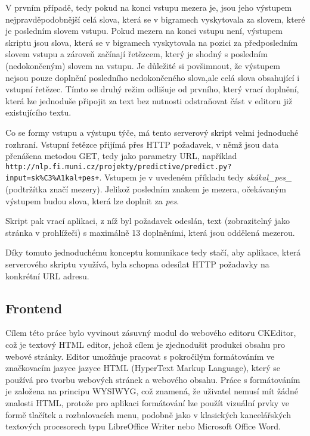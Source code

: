 \documentclass[a4paper,11pt]{article}
\begin{document}
V prvním případě, tedy pokud na konci vstupu mezera je, jsou jeho výstupem nejpravděpodobnější celá slova, která se v bigramech vyskytovala za slovem, které je posledním slovem vstupu. Pokud mezera na konci vstupu není, výstupem skriptu jsou slova, která se v bigramech vyskytovala na pozici za předposledním slovem vstupu a zároveň začínají řetězcem, který je shodný s posledním (nedokončeným) slovem na vstupu. Je důležité si povšimnout, že výstupem nejsou pouze doplnění posledního nedokončeného slova,ale celá slova obsahující i vstupní řetězec. Tímto se druhý režim odlišuje od prvního, který vrací doplnění, která lze jednoduše připojit za text bez nutnosti odstraňovat část v editoru již existujícího textu.

Co se formy vstupu a výstupu týče, má tento serverový skript velmi jednoduché rozhraní. Vstupní řetězce přijímá přes HTTP požadavek, v němž jsou data přenášena metodou GET, tedy jako parametry URL, například {\tt http://nlp.fi.muni.cz/projekty/predictive/predict.py?input=sk\%C3\%A1kal+pes+}. Vstupem je v uvedeném příkladu tedy {\it skákal\_pes\_} (podtržítka značí mezery). Jelikož posledním znakem je mezera, očekávaným výstupem budou slova, která lze doplnit za {\it pes}. 

Skript pak vrací aplikaci, z níž byl požadavek odeslán, text (zobrazitelný jako stránka v prohlížeči) s maximálně 13 doplněními, která jsou oddělená mezerou.

Díky tomuto jednoduchému konceptu komunikace tedy stačí, aby aplikace, která serverového skriptu využívá, byla schopna odesílat HTTP požadavky na konkrétní URL adresu. 

\subsection{Frontend}

Cílem této práce bylo vyvinout zásuvný modul do webového editoru CKEditor, což je textový HTML editor, jehož cílem je zjednodušit produkci obsahu pro webové stránky. Editor umožňuje pracovat s pokročilým formátováním ve značkovacím jazyce jazyce HTML (HyperText Markup Language), který se používá pro tvorbu webových stránek a webového obsahu. Práce s formátováním je založena na principu WYSIWYG, což znamená, že uživatel nemusí mít žádné znalosti HTML, protože pro aplikaci formátování lze použít vizuální prvky ve formě tlačítek a rozbalovacích menu, podobně jako v klasických kancelářských textových procesorech typu LibreOffice Writer nebo Microsoft Office Word.
\end{document}

